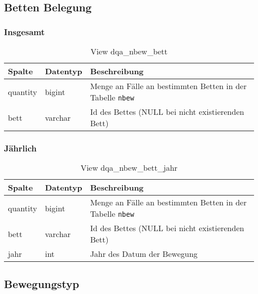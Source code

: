 \subsection{Betten Belegung} \label{subsec:bett}

\subsubsection{Insgesamt} \label{subsubsec:bettI}

\begin{table}[ht]
	\centering   
	\caption{View dqa\_nbew\_bett}
	\label{tab:beweBettAll}
	\begin{tabular}{||l|l|p{10cm}||}   		
		\hline
		Spalte & Datentyp & Beschreibung \\ [0.5ex]
		\hline\hline
		quantity & bigint & Menge an Fälle an bestimmten Betten in der Tabelle \texttt{nbew} \\
		\hline
		bett & varchar & Id des Bettes (NULL bei nicht existierenden Bett)\\
		\hline
		
	\end{tabular}
\end{table}

\subsubsection{Jährlich} \label{subsubsec:bettJ}

\begin{table}[ht]
	\centering   
	\caption{View dqa\_nbew\_bett\_jahr}
	\label{tab:beweBettJahr}
	\begin{tabular}{||l|l|p{10cm}||}   		
		\hline
		Spalte & Datentyp & Beschreibung \\ [0.5ex]
		\hline\hline
		quantity & bigint & Menge an Fälle an bestimmten Betten in der Tabelle \texttt{nbew} \\
		\hline
		bett & varchar &  Id des Bettes (NULL bei nicht existierenden Bett) \\
		\hline
		jahr & int &  Jahr des Datum der Bewegung \\
		\hline		
	\end{tabular}
\end{table}

\subsection{Bewegungstyp} \label{subsec:bewtyp}

